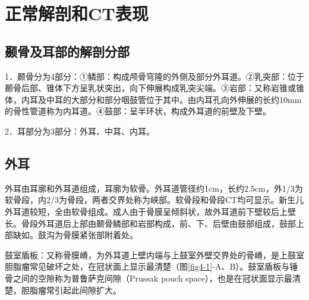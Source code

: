 \section{正常解剖和CT表现}

\subsection{颞骨及耳部的解剖分部}

1．颞骨分为4部分：①鳞部：构成颅骨穹隆的外侧及部分外耳道。②乳突部：位于颞骨后部、锥体下方呈乳状突出，向下伸展构成乳突尖端。③岩部：又称岩锥或锥体，内耳及中耳的大部分和部分咽鼓管位于其中。由内耳孔向外伸展的长约10mm的骨性管道称为内耳道。④鼓部：呈半环状，构成外耳道的前壁及下壁。

2．耳部分为3部分：外耳、中耳、内耳。

\subsection{外耳}

外耳由耳廓和外耳道组成，耳廓为软骨。外耳道管径约1cm，长约2.5cm，外1/3为软骨段，内2/3为骨段，两者交界处称为峡部。软骨段和骨段CT均可显示。新生儿外耳道较短，全由软骨组成。成人由于骨膜呈倾斜状，故外耳道前下壁较后上壁长。骨段外耳道后上部由颞骨鳞部和岩部构成，前、下、后壁由鼓部组成，鼓部上部缺如。鼓沟为骨膜紧张部附着处。

鼓室盾板：又称骨膜嵴，为外耳道上壁内端与上鼓室外壁交界处的骨嵴，是上鼓室胆脂瘤常见破坏之处，在冠状面上显示最清楚（图\ref{fig4-1}-A、B）。鼓室盾板与锤骨之间的空隙称为普鲁萨克间隙（Prussak
pouch space），也是在冠状面显示最清楚，胆脂瘤常引起此间隙扩大。


